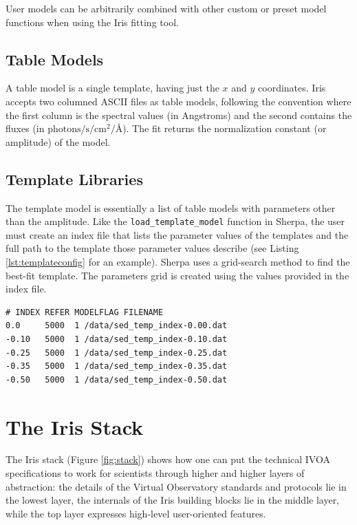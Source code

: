 \documentclass[preprint,authoryear,5p]{elsarticle}
\begin{document}
User models can be arbitrarily combined with other custom or preset model
functions when using the Iris fitting tool.

\subsection{Table Models} A table model is a single template, having just the
$x$ and $y$ coordinates. Iris accepts two columned ASCII files as table models,
following the convention where the first column is the spectral values (in
Angstroms) and the second contains the fluxes (in
$\mathrm{photons}/\mathrm{s}/\mathrm{cm}^{2}/\mbox{\AA}$). The fit returns the
normalization constant (or amplitude) of the model.

\begin{sloppypar}
\subsection{Template Libraries} The template model is essentially a list of
table models with parameters other than the amplitude. Like the
\texttt{load\_template\_model} function in Sherpa, the user must create an index
file that lists the parameter values of the templates and the full path to the
template those parameter values describe (see Listing \ref{lst:templateconfig}
for an example). Sherpa uses a grid-search method to find the best-fit template.
The parameters grid is created using the values provided in the index file.
\end{sloppypar}

\begin{lstlisting}[style=code,
	caption={Example of template library definition file. Template library definition
	 files are in ASCII format.},
	label=lst:templateconfig]
# INDEX REFER MODELFLAG FILENAME
0.0     5000  1	/data/sed_temp_index-0.00.dat
-0.10   5000  1 /data/sed_temp_index-0.10.dat
-0.25   5000  1 /data/sed_temp_index-0.25.dat
-0.35   5000  1 /data/sed_temp_index-0.35.dat
-0.50   5000  1 /data/sed_temp_index-0.50.dat
\end{lstlisting}

\section{The Iris Stack} \label{sec:stack}

\begin{sloppypar}
The Iris stack (Figure \ref{fig:stack}) shows how one can put the 
technical IVOA specifications to work for scientists through higher and higher
layers of abstraction: the details of the Virtual Observatory
standards and protocols lie in the lowest layer, the internals of the Iris
building blocks lie in the middle layer, while the top layer expresses
high-level user-oriented features.
\end{sloppypar}
\end{document}
